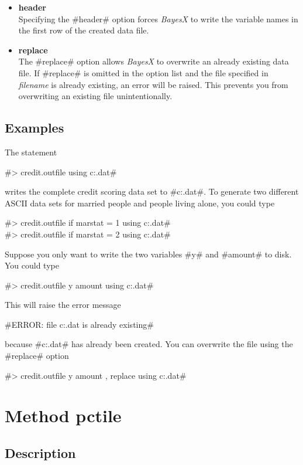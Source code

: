 \begin{itemize}
\item {\bf header} \\
Specifying the #header# option forces {\em BayesX} to write the
variable names in the first row of the created data file.
\item {\bf replace} \\
The #replace# option allows {\em BayesX} to overwrite an already
existing data file. If #replace# is omitted in the option list and
the file specified in {\em filename} is already existing, an error
will be raised.
This prevents you from overwriting an existing file unintentionally.
\end{itemize}


\subsection*{Examples}

The statement

#> credit.outfile using c:\data\cr.dat#

writes the complete credit scoring data set to
#c:\data\cr.dat#. To generate two different
ASCII
data sets for married people and people living alone, you could type

#> credit.outfile if marstat = 1 using c:\data\crmarried.dat# \\
#> credit.outfile if marstat = 2 using c:\data\cralone.dat#

Suppose you only want to write the two variables #y# and #amount#
to disk. You could type

#> credit.outfile y amount using c:\data\cr.dat#

This will raise the error message

#ERROR: file c:\data\cr.dat is already existing#

\newpage

because #c:\data\cr.dat# has already been created. You can
overwrite the file using the #replace# option

#> credit.outfile y amount , replace using c:\data\cr.dat#


\section{Method pctile}
\label{pcitle} 

\subsection*{Description}


